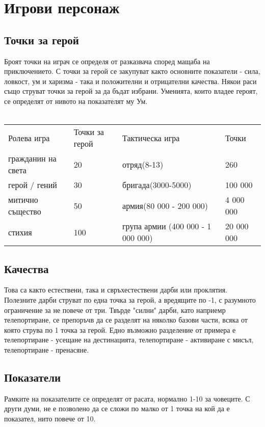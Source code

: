 
\section{Игрови персонаж}

\subsection{Точки за герой}
Броят точки на играч се определя от разказвача според мащаба на приключението.
С точки за герой се закупуват както основните показатели - сила, ловкост, ум и харизма - така и положителни и отрицателни качества.
Някои раси също струват точки за герой за да бъдат избрани.
Уменията, които владее героят, се определят от нивото на показателят му Ум.
\\
\\
\begin{tabular}{p{3cm} | p{2cm} | p{6cm} | p{3cm}}
Ролева игра          & Точки за герой      & Тактическа игра                   & Точки       \\
гражданин на света   & 20                  & отряд(8-13)                       & 260         \\
герой / гений        & 30                  & бригада(3000-5000)                & 100 000     \\
митично същество     & 50                  & армия(80 000 - 200 000)           & 4 000 000   \\
стихия               & 100                 & група армии (400 000 - 1 000 000) & 20 000 000  \\
\end{tabular}

\subsection{Качества}
Това са както естествени, така и свръхестествени дарби или проклятия.
Полезните дарби струват по една точка за герой, а вредящите по -1, с разумното ограничение за не повече от три.
Твърде "силни" дарби, като наприемр телепортиране, се препоръчв да се разделят на няколко базови части, всяка от която струва по 1 точка за герой.
Едно възможно разделение от примера е телепортиране - усещане на дестинацията, телепортиране - активиране с мисъл, телепортиране - пренасяне.

\subsection{Показатели}
Рамките на показателите се определят от расата, нормално 1-10 за човеците.
С други думи, не е позволено да се сложи по малко от 1 точка на кой да е показател, нито повече от 10.

